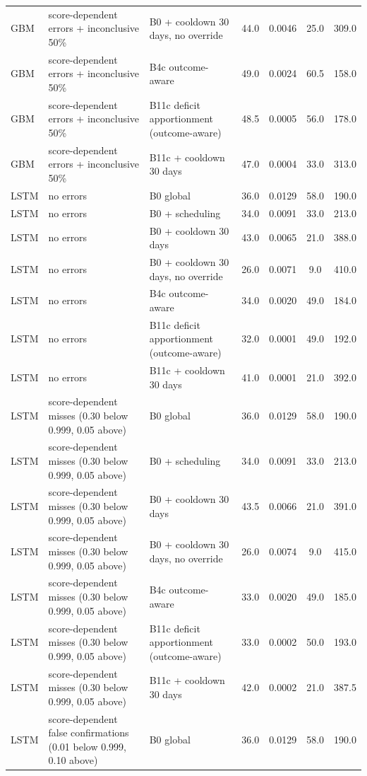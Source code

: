 \documentclass[10pt,onecolumn,letterpaper]{article}
\begin{document}
\begin{longtable}{lp{5.2cm}p{4.4cm}cccc}
GBM & score-dependent errors + inconclusive 50\% & B0 + cooldown 30 days, no override & 44.0 & 0.0046 & 25.0 & 309.0 \\
GBM & score-dependent errors + inconclusive 50\% & B4c outcome-aware & 49.0 & 0.0024 & 60.5 & 158.0 \\
GBM & score-dependent errors + inconclusive 50\% & B11c deficit apportionment (outcome-aware) & 48.5 & 0.0005 & 56.0 & 178.0 \\
GBM & score-dependent errors + inconclusive 50\% & B11c + cooldown 30 days & 47.0 & 0.0004 & 33.0 & 313.0 \\
LSTM & no errors & B0 global & 36.0 & 0.0129 & 58.0 & 190.0 \\
LSTM & no errors & B0 + scheduling & 34.0 & 0.0091 & 33.0 & 213.0 \\
LSTM & no errors & B0 + cooldown 30 days & 43.0 & 0.0065 & 21.0 & 388.0 \\
LSTM & no errors & B0 + cooldown 30 days, no override & 26.0 & 0.0071 & 9.0 & 410.0 \\
LSTM & no errors & B4c outcome-aware & 34.0 & 0.0020 & 49.0 & 184.0 \\
LSTM & no errors & B11c deficit apportionment (outcome-aware) & 32.0 & 0.0001 & 49.0 & 192.0 \\
LSTM & no errors & B11c + cooldown 30 days & 41.0 & 0.0001 & 21.0 & 392.0 \\
LSTM & score-dependent misses (0.30 below 0.999, 0.05 above) & B0 global & 36.0 & 0.0129 & 58.0 & 190.0 \\
LSTM & score-dependent misses (0.30 below 0.999, 0.05 above) & B0 + scheduling & 34.0 & 0.0091 & 33.0 & 213.0 \\
LSTM & score-dependent misses (0.30 below 0.999, 0.05 above) & B0 + cooldown 30 days & 43.5 & 0.0066 & 21.0 & 391.0 \\
LSTM & score-dependent misses (0.30 below 0.999, 0.05 above) & B0 + cooldown 30 days, no override & 26.0 & 0.0074 & 9.0 & 415.0 \\
LSTM & score-dependent misses (0.30 below 0.999, 0.05 above) & B4c outcome-aware & 33.0 & 0.0020 & 49.0 & 185.0 \\
LSTM & score-dependent misses (0.30 below 0.999, 0.05 above) & B11c deficit apportionment (outcome-aware) & 33.0 & 0.0002 & 50.0 & 193.0 \\
LSTM & score-dependent misses (0.30 below 0.999, 0.05 above) & B11c + cooldown 30 days & 42.0 & 0.0002 & 21.0 & 387.5 \\
LSTM & score-dependent false confirmations (0.01 below 0.999, 0.10 above) & B0 global & 36.0 & 0.0129 & 58.0 & 190.0 \\

\end{longtable}
\end{document}

